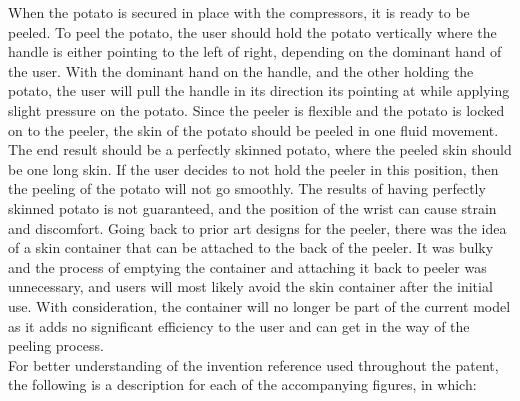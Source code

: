 \documentclass[twocolumn]{article}
\begin{document}
When the potato is secured in place with the compressors, it is ready to be peeled. To peel the potato, the user should hold the potato vertically where the handle is either pointing to the left of right, depending on the dominant hand of the user. With the dominant hand on the handle, and the other holding the potato, the user will pull the handle in its direction its pointing at while applying slight pressure on the potato. Since the peeler is flexible and the potato is locked on to the peeler, the skin of the potato should be peeled in one fluid movement. The end result should be a perfectly skinned potato, where the peeled skin should be one long skin. If the user decides to not hold the peeler in this position, then the peeling of the potato will not go smoothly. The results of having perfectly skinned potato is not guaranteed, and the position of the wrist can cause strain and discomfort. Going back to prior art designs for the peeler, there was the idea of a skin container that can be attached to the back of the peeler. It was bulky and the process of emptying the container and attaching it back to peeler was unnecessary, and users will most likely avoid the skin container after the initial use. With consideration, the container will no longer be part of the current model as it adds no significant efficiency to the user and can get in the way of the peeling process.
\\
For better understanding of the invention reference used throughout the patent, the following is a description for each of the accompanying figures, in which:
\\
\\
\\
\\
\\
\par
\end{document}
